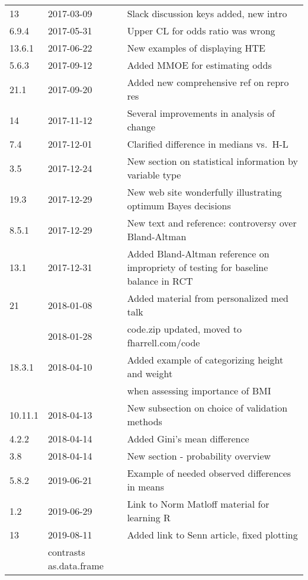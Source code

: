 \documentclass{report}
\begin{document}
\begin{center}
\begin{tabular}{lll}
13      & 2017-03-09 & Slack discussion keys added, new intro \\
6.9.4   & 2017-05-31 & Upper CL for odds ratio was wrong \\
13.6.1  & 2017-06-22 & New examples of displaying HTE \\
5.6.3   & 2017-09-12 & Added MMOE for estimating odds \\
21.1    & 2017-09-20 & Added new comprehensive ref on repro res \\
14      & 2017-11-12 & Several improvements in analysis of change\\
7.4     & 2017-12-01 & Clarified difference in medians vs.\ H-L\\
3.5     & 2017-12-24 & New section on statistical information by
                       variable type\\
19.3    & 2017-12-29 & New web site wonderfully illustrating optimum
                       Bayes decisions\\
8.5.1   & 2017-12-29 & New text and reference: controversy over
                       Bland-Altman\\
13.1    & 2017-12-31 & Added Bland-Altman reference on impropriety of
                       testing for baseline balance in RCT\\
21      & 2018-01-08 & Added material from personalized med talk\\
        & 2018-01-28 & code.zip updated, moved to fharrell.com/code\\
18.3.1  & 2018-04-10 & Added example of categorizing height and weight\\
        &            & when assessing importance of BMI\\
10.11.1 & 2018-04-13 & New subsection on choice of validation methods\\
4.2.2   & 2018-04-14 & Added Gini's mean difference\\
3.8     & 2018-04-14 & New section - probability overview\\
5.8.2   & 2019-06-21 & Example of needed observed differences in means\\
1.2     & 2019-06-29 & Link to Norm Matloff material for learning R\\
13      & 2019-08-11 & Added link to Senn article, fixed plotting\\
                     & contrasts as.data.frame\\
  \hline
\end{tabular}\end{center}
\else
\fi
\end{document}
